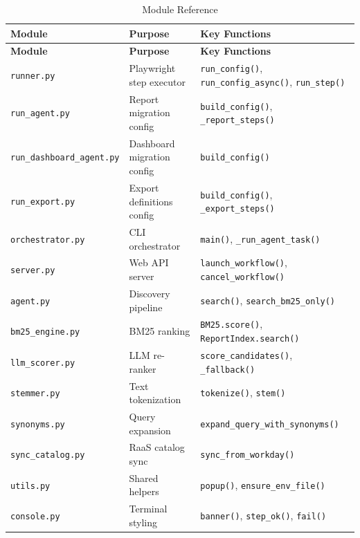 \documentclass[12pt,a4paper]{article}
\begin{document}
\begin{longtable}{p{3.8cm} p{5cm} p{5cm}}
\caption{Module Reference} \label{tab:modules} \\
\toprule
\textbf{Module} & \textbf{Purpose} & \textbf{Key Functions} \\
\midrule
\endfirsthead
\toprule
\textbf{Module} & \textbf{Purpose} & \textbf{Key Functions} \\
\midrule
\endhead
\texttt{runner.py} & Playwright step executor & \texttt{run\_config()}, \texttt{run\_config\_async()}, \texttt{run\_step()} \\
\midrule
\texttt{run\_agent.py} & Report migration config & \texttt{build\_config()}, \texttt{\_report\_steps()} \\
\midrule
\texttt{run\_dashboard\_agent.py} & Dashboard migration config & \texttt{build\_config()} \\
\midrule
\texttt{run\_export.py} & Export definitions config & \texttt{build\_config()}, \texttt{\_export\_steps()} \\
\midrule
\texttt{orchestrator.py} & CLI orchestrator & \texttt{main()}, \texttt{\_run\_agent\_task()} \\
\midrule
\texttt{server.py} & Web API server & \texttt{launch\_workflow()}, \texttt{cancel\_workflow()} \\
\midrule
\texttt{agent.py} & Discovery pipeline & \texttt{search()}, \texttt{search\_bm25\_only()} \\
\midrule
\texttt{bm25\_engine.py} & BM25 ranking & \texttt{BM25.score()}, \texttt{ReportIndex.search()} \\
\midrule
\texttt{llm\_scorer.py} & LLM re-ranker & \texttt{score\_candidates()}, \texttt{\_fallback()} \\
\midrule
\texttt{stemmer.py} & Text tokenization & \texttt{tokenize()}, \texttt{stem()} \\
\midrule
\texttt{synonyms.py} & Query expansion & \texttt{expand\_query\_with\_synonyms()} \\
\midrule
\texttt{sync\_catalog.py} & RaaS catalog sync & \texttt{sync\_from\_workday()} \\
\midrule
\texttt{utils.py} & Shared helpers & \texttt{popup()}, \texttt{ensure\_env\_file()} \\
\midrule
\texttt{console.py} & Terminal styling & \texttt{banner()}, \texttt{step\_ok()}, \texttt{fail()} \\
\bottomrule
\end{longtable}

\end{document}
